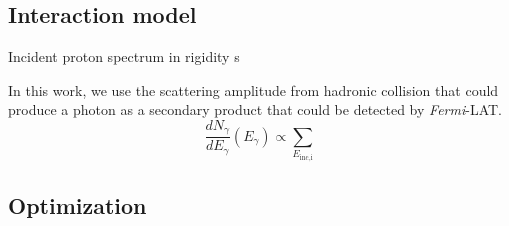 \subsection{Interaction model}

Incident proton spectrum in rigidity s

In this work, we use the scattering amplitude from hadronic collision \cite{K&Omodel} that could produce a photon as a secondary product that could be detected by \textit{Fermi}-LAT.
\begin{equation}
    \frac{dN_{\gamma}}{dE_\gamma}(E_\gamma)
    \propto \sum_{E_{\textrm{inc,i}}}
\end{equation}


\subsection{Optimization}


